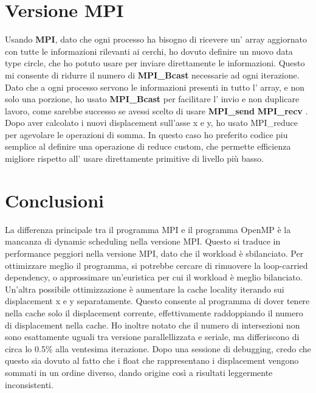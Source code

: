 \documentclass[a4paper,12pt, twoside]{report}
\begin{document}
\section*{Versione MPI}
Usando \textbf{MPI}\cite{mpi}, dato che ogni processo ha bisogno di ricevere un' array aggiornato con tutte le informazioni rilevanti ai cerchi, 
ho dovuto definire un nuovo data type circle, che ho potuto usare per inviare direttamente le informazioni. 
Questo mi consente di ridurre il numero di  \textbf{MPI\_Bcast} \cite{mpi_bcast} necessarie ad ogni iterazione. Dato che a ogni processo servono le
informazioni presenti in tutto l' array, e non solo una porzione, ho usato \textbf{MPI\_Bcast}\cite{mpi_bcast} per facilitare l' invio e non duplicare lavoro,
come sarebbe successo se avessi scelto di usare \textbf{MPI\_send} \cite{mpi_send} \textbf{MPI\_recv} \cite{mpi_recv}. 
Dopo aver calcolato i nuovi displacement sull'asse x e y, ho usato MPI\_reduce per agevolare le operazioni di somma. 
In questo caso ho preferito codice piu semplice al definire una operazione di reduce custom, 
che permette efficienza migliore rispetto all' usare direttamente primitive di livello più basso.

\section*{Conclusioni}
La differenza principale tra il programma MPI e il programma OpenMP è la mancanza di dynamic scheduling nella versione MPI. 
Questo si traduce in performance peggiori nella versione MPI, dato che il workload è sbilanciato.
Per ottimizzare meglio il programma, si potrebbe cercare di rimuovere la loop-carried dependency, o approssimare un'euristica per cui il workload è meglio bilanciato. 
Un'altra possibile ottimizzazione è aumentare la cache locality iterando sui displacement x e y separatamente.
Questo consente al programma di dover tenere nella cache solo il displacement corrente, effettivamente raddoppiando il numero di displacement nella cache.
Ho inoltre notato che il numero di intersezioni non sono esattamente uguali tra versione parallellizzata e seriale, ma differiscono di circa lo 0.5\% alla ventesima iterazione. Dopo una sessione di debugging,
credo che questo sia dovuto al fatto che i float che rappresentano i displacement vengono sommati in un ordine diverso, dando origine così a risultati leggermente inconsistenti.
\printbibliography
\appendix
\end{document}
